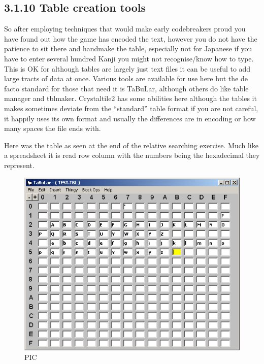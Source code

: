 \documentclass[
]{book}
\begin{document}
\hypertarget{table-creation-tools}{%
\subsection{3.1.10 Table creation tools}\label{table-creation-tools}}

So after employing techniques that would make early codebreakers proud you have found out how the game has encoded the text, however you do not have the patience to sit there and handmake the table, especially not for Japanese if you have to enter several hundred Kanji you might not recognise/know how to type. This is OK for although tables are largely just text files it can be useful to add large tracts of data at once. Various tools are available for use here but the de facto standard for those that need it is TaBuLar, although others do like table manager and tblmaker. Crystaltile2 has some abilities here although the tables it makes sometimes deviate from the ``standard'' table format if you are not careful, it happily uses its own format and usually the differences are in encoding or how many spaces the file ends with.

Here was the table as seen at the end of the relative searching exercise. Much like a spreadsheet it is read row column with the numbers being the hexadecimal they represent.

\begin{figure}
\centering
\includegraphics{images/97_home_fast6191_romhackingguide_unrenamed_file___al_borders_romhackingguidertexttablemaking1.png}
\caption{PIC}
\end{figure}
\end{document}
